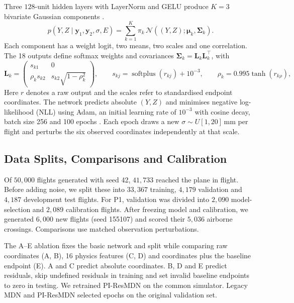 \documentclass[11pt,a4paper]{article}
\begin{document}
Three $128$-unit hidden layers with LayerNorm and GELU produce $K=3$ bivariate Gaussian components \cite{layernorm2016,gelu2016}.
\begin{equation}
  p(Y,Z\mid\mathbf{y}_1,\mathbf{y}_2,\sigma,E)=
  \sum_{k=1}^{K}\pi_k\,
  \mathcal{N}\!\left((Y,Z);\boldsymbol{\mu}_k,\boldsymbol{\Sigma}_k\right).
  \label{eq:mixture}
\end{equation}
Each component has a weight logit, two means, two scales and one correlation. The 18 outputs define softmax weights and covariances $\boldsymbol{\Sigma}_k=\mathbf L_k\mathbf L_k^{\!\top}$, with
\begin{equation}
  \mathbf{L}_k=
  \begin{pmatrix}
    s_{k1} & 0\\
    \rho_k s_{k2} & s_{k2}\sqrt{1-\rho_k^{2}}
  \end{pmatrix},
  \qquad
  s_{kj}=\operatorname{softplus}(r_{kj})+10^{-3},
  \qquad
  \rho_k=0.995\tanh(r_{k\rho}),
  \label{eq:chol}
\end{equation}
Here $r$ denotes a raw output and the scales refer to standardised endpoint coordinates. The network predicts absolute $(Y,Z)$ and minimises negative log-likelihood (NLL) using Adam, an initial learning rate of $10^{-3}$ with cosine decay, batch size 256 and 100 epochs \cite{kingma2015}. Each epoch draws a new $\sigma\sim U[1,20]\,\mathrm{mm}$ per flight and perturbs the six observed coordinates independently at that scale.

\subsection{Data Splits, Comparisons and Calibration}
\label{sec:splits}

Of $50{,}000$ flights generated with seed 42, $41{,}733$ reached the plane in flight. Before adding noise, we split these into $33{,}367$ training, $4{,}179$ validation and $4{,}187$ development test flights. For P1, validation was divided into $2{,}090$ model-selection and $2{,}089$ calibration flights. After freezing model and calibration, we generated $6{,}000$ new flights (seed 155107) and scored their $5{,}036$ airborne crossings. Comparisons use matched observation perturbations.

The A--E ablation fixes the basic network and split while comparing raw coordinates (A, B), 16 physics features (C, D) and coordinates plus the baseline endpoint (E). A and C predict absolute coordinates. B, D and E predict residuals, skip undefined residuals in training and set invalid baseline endpoints to zero in testing. We retrained PI-ResMDN on the common simulator. Legacy MDN and PI-ResMDN selected epochs on the original validation set.
\end{document}
